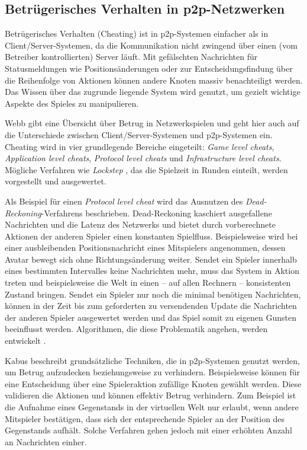 \subsection{Betrügerisches Verhalten in p2p-Netzwerken}
\label{chap:grundlagen:cheating}
Betrügerisches Verhalten (Cheating) ist in p2p-Systemen einfacher als in Client/Server-Systemen, da die Kommunikation nicht zwingend über einen (vom Betreiber kontrollierten) Server läuft. Mit gefälschten Nachrichten für Statusmeldungen wie Positionsänderungen oder zur Entscheidungsfindung über die Reihenfolge von Aktionen können andere Knoten massiv benachteiligt werden. Das Wissen über das zugrunde liegende System wird genutzt, um gezielt wichtige Aspekte des Spieles zu manipulieren.

Webb \cite{Webb2007Cheating} gibt eine Übersicht über Betrug in Netzwerkspielen und geht hier auch auf die Unterschiede zwischen Client/Server-Systemen und p2p-Systemen ein. Cheating wird in vier grundlegende Bereiche eingeteilt: \emph{Game level cheats}, \emph{Application level cheats}, \emph{Protocol level cheats} und \emph{Infrastructure level cheats}. Mögliche Verfahren wie \emph{Lockstep} \cite{Baughman2007}, das die Spielzeit in Runden einteilt, werden vorgestellt und ausgewertet.

Als Beispiel für einen \emph{Protocol level cheat} wird das Ausnutzen des \emph{Dead-Reckoning}-Verfahrens \cite{Pantel2002} beschrieben. Dead-Reckoning kaschiert ausgefallene Nachrichten und die Latenz des Netzwerks und bietet durch vorberechnete Aktionen der anderen Spieler einen konstanten Spielfluss. Beispielsweise wird bei einer ausbleibenden Positionsnachricht eines Mitspielers angenommen, dessen Avatar bewegt sich ohne Richtungsänderung weiter. Sendet ein Spieler innerhalb eines bestimmten Intervalles keine Nachrichten mehr, muss das System in Aktion treten und beispielsweise die Welt in einen -- auf allen Rechnern -- konsistenten Zustand bringen. Sendet ein Spieler nur noch die minimal benötigen Nachrichten, können in der Zeit bis zum geforderten zu versendenden Update die Nachrichten der anderen Spieler ausgewertet werden und das Spiel somit zu eigenen Gunsten beeinflusst werden. Algorithmen, die diese Problematik angehen, werden entwickelt \cite{Aggarwal2005}.

Kabus \cite{Kabus2007Design, Kabus2009} beschreibt grundsätzliche Techniken, die in p2p-Systemen genutzt werden, um Betrug aufzudecken beziehungsweise zu verhindern. Beispielsweise können für eine Entscheidung über eine Spieleraktion zufällige Knoten gewählt werden. Diese validieren die Aktionen und können effektiv Betrug verhindern. Zum Beispiel ist die Aufnahme eines Gegenstands in der virtuellen Welt nur erlaubt, wenn andere Mitspieler bestätigen, dass sich der entsprechende Spieler an der Position des Gegenstands aufhält. Solche Verfahren gehen jedoch mit einer erhöhten Anzahl an Nachrichten einher.

